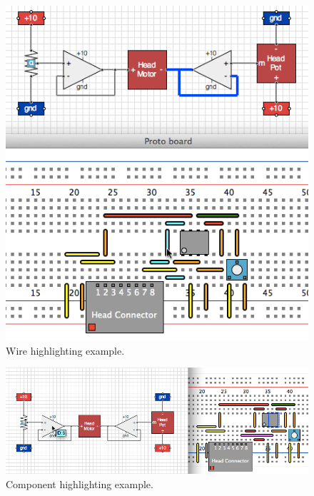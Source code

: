 \begin{figure}
\begin{center}
\includegraphics[width=\textwidth]{Images/gui_wire_highlight.png}
\caption{Wire highlighting example.}
\label{fig:wire_highlight}
\end{center}
\end{figure}

\begin{figure}
\begin{center}
\includegraphics[width=\textwidth]{Images/gui_component_highlight.png}
\caption{Component highlighting example.}
\label{fig:component_highlight}
\end{center}
\end{figure}

